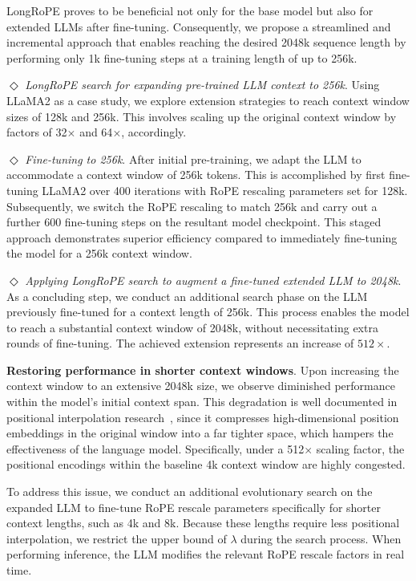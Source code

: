 LongRoPE proves to be beneficial not only for the base model but also for extended LLMs after fine-tuning. Consequently, we propose a streamlined and incremental approach that enables reaching the desired 2048k sequence length by performing only 1k fine-tuning steps at a training length of up to 256k.

$\Diamond$ \textit{LongRoPE search for expanding pre-trained LLM context to 256k}. Using LLaMA2 as a case study, we explore extension strategies to reach context window sizes of 128k and 256k. This involves scaling up the original context window by factors of 32$\times$ and 64$\times$, accordingly.

$\Diamond$ \textit{Fine-tuning to 256k}. After initial pre-training, we adapt the LLM to accommodate a context window of 256k tokens. This is accomplished by first fine-tuning LLaMA2 over 400 iterations with RoPE rescaling parameters set for 128k. Subsequently, we switch the RoPE rescaling to match 256k and carry out a further 600 fine-tuning steps on the resultant model checkpoint. This staged approach demonstrates superior efficiency compared to immediately fine-tuning the model for a 256k context window.

$\Diamond$ \textit{Applying LongRoPE search to augment a fine-tuned extended LLM to 2048k}. As a concluding step, we conduct an additional search phase on the LLM previously fine-tuned for a context length of 256k. This process enables the model to reach a substantial context window of 2048k, without necessitating extra rounds of fine-tuning. The achieved extension represents an increase of $512\times$.

\textbf{Restoring performance in shorter context windows}. Upon increasing the context window to an extensive 2048k size, we observe diminished performance within the model's initial context span. This degradation is well documented in positional interpolation research~\cite{pi}, since it compresses high-dimensional position embeddings in the original window into a far tighter space, which hampers the effectiveness of the language model. Specifically, under a 512$\times$ scaling factor, the positional encodings within the baseline 4k context window are highly congested.

To address this issue, we conduct an additional evolutionary search on the expanded LLM to fine-tune RoPE rescale parameters specifically for shorter context lengths, such as 4k and 8k. Because these lengths require less positional interpolation, we restrict the upper bound of $\lambda$ during the search process. When performing inference, the LLM modifies the relevant RoPE rescale factors in real time.

